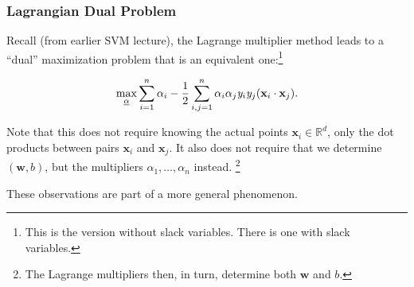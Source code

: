 \documentclass[smaller]{beamer}
\theoremstyle{example}
\newcommand{\x}{\textbf{x}}
\newcommand{\ix}[1]{{\it #1}}
\begin{document}
\begin{frame}
    \frametitle{Lagrangian Dual Problem}
    Recall (from earlier SVM lecture), the Lagrange multiplier method leads to a ``dual'' maximization problem that is an equivalent one:\footnote{This is the version without slack variables. There is one with slack variables.}

    \[\max_{\emph{\alpha}} \sum_{i=1}^n\alpha_i - \frac12\sum_{i,j=1}^n\alpha_i\alpha_j\ix y_i\ix y_j (\x_i\cdot\x_j).\]

    \pause
    Note that this does not require knowing the actual points $\x_i\in\mathbb R^d$, only the dot products between pairs $\x_i$ and $\x_j$. It also does not require that we determine $(\textbf{w},b)$, but the multipliers $\alpha_1,\ldots,\alpha_n$ instead. \footnote{The Lagrange multipliers then, in turn, determine both $\textbf{w}$ and $b$.}

    \pause
    \medskip
    These observations are part of a more general phenomenon.
\end{frame}
\end{document}
